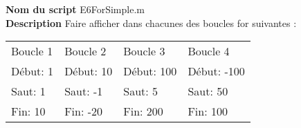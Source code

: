 \textbf{Nom du script}
E6ForSimple.m\\
\textbf{Description}
Faire afficher dans chacunes des boucles for suivantes : 	\\\hspace*{-1cm}\begin{tabular}{| l | l | l | l |} 		\hline 		Boucle 1 & Boucle 2 & Boucle 3 & Boucle 4\\ 		Début: 1 & Début: 10 & Début: 100 & Début: -100\\ 		Saut: 1 & Saut: -1 & Saut: 5 & Saut: 50\\ 		Fin: 10 & Fin: -20 & Fin: 200 & Fin: 100\\ 		\hline 	\end{tabular}